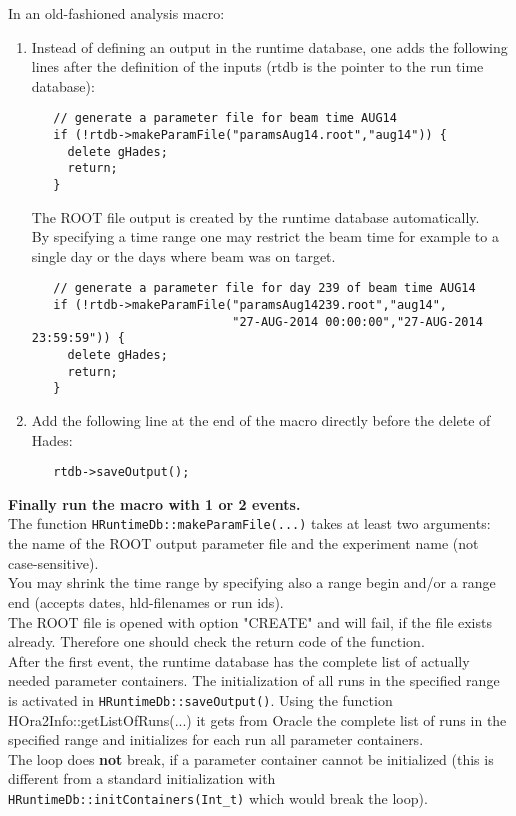 In an old-fashioned analysis macro:
\begin{enumerate}
 \item Instead of defining an output in the runtime database, one adds the following lines after the definition of the 
   inputs (rtdb is the pointer to the run time database):
   \begin{lstlisting}
   // generate a parameter file for beam time AUG14
   if (!rtdb->makeParamFile("paramsAug14.root","aug14")) {
     delete gHades;
     return;
   }
   \end{lstlisting}
   The ROOT file output is created by the runtime database automatically.\\
   By specifying a time range one may restrict the beam time for example to a single day or the days where beam was on target.
   \begin{lstlisting}
   // generate a parameter file for day 239 of beam time AUG14
   if (!rtdb->makeParamFile("paramsAug14239.root","aug14",
                            "27-AUG-2014 00:00:00","27-AUG-2014 23:59:59")) {
     delete gHades;
     return;
   }
   \end{lstlisting}
 \item Add the following line at the end of the macro directly before the delete of Hades:
   \begin{lstlisting}
   rtdb->saveOutput();
   \end{lstlisting}
\end{enumerate}
\textbf{Finally run the macro with 1 or 2 events.}\\

The function \verb+HRuntimeDb::makeParamFile(...)+ takes at least two arguments: the name of the ROOT output parameter file 
and the experiment name (not case-sensitive).\\
You may shrink the time range by specifying also a range begin and/or a range end (accepts dates, hld-filenames or run ids).\\

The ROOT file is opened with option "CREATE" and will fail, if the file exists already. Therefore one should check the 
return code of the function.\\

After the first event, the runtime database has the complete list of actually needed parameter containers. The 
initialization of all runs in the specified range is activated in \verb+HRuntimeDb::saveOutput()+. Using the function 
HOra2Info::getListOfRuns(...) it gets from Oracle the complete list of runs in the specified range and initializes for each
run all parameter containers.\\
The loop does \textbf{not} break, if a parameter container cannot be initialized (this is different from 
a standard initialization with \verb+ HRuntimeDb::initContainers(Int_t)+ which would break the loop).\\

